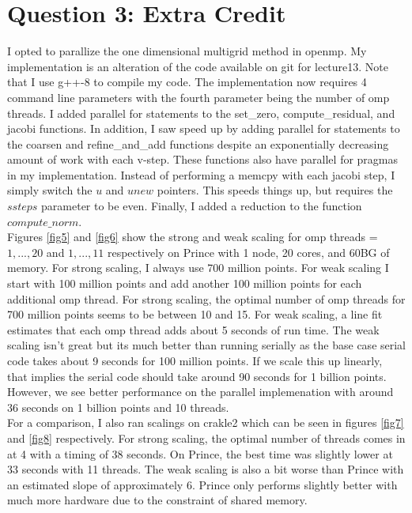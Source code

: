 \documentclass[10pt]{article}
\begin{document}
\lipsum


\section{Question 3: Extra Credit}

I opted to parallize the one dimensional multigrid method in openmp. My implementation is an alteration of the code available on git for lecture13. Note that I use g++-8 to compile my code. The implementation now requires 4 command line parameters with the fourth parameter being the number of omp threads. I added parallel for statements to the set\_zero, compute\_residual, and jacobi functions. In addition, I saw speed up by adding parallel for statements to the coarsen and refine\_and\_add functions despite an exponentially decreasing amount of work with each v-step. These functions also have parallel for pragmas in my implementation. Instead of performing a memcpy with each jacobi step, I simply switch the $u$ and $unew$ pointers. This speeds things up, but requires the $ssteps$ parameter to be even. Finally, I added a reduction to the function $compute\_norm$.\\

Figures \ref{fig5} and \ref{fig6} show the strong and weak scaling for omp threads = $1,...,20$ and $1,...,11$ respectively on Prince with 1 node, 20 cores, and 60BG of memory. For strong scaling, I always use 700 million points. For weak scaling I start with 100 million points and add another 100 million points for each additional omp thread. For strong scaling, the optimal number of omp threads for 700 million points seems to be between 10 and 15. For weak scaling, a line fit estimates that each omp thread adds about 5 seconds of run time. The weak scaling isn't great but its much better than running serially as the base case serial code takes about 9 seconds for 100 million points. If we scale this up linearly, that implies the serial code should take around 90 seconds for 1 billion points. However, we see better performance on the parallel implemenation with around 36 seconds on 1 billion points and 10 threads.\\

For a comparison, I also ran scalings on crakle2 which can be seen in figures \ref{fig7} and \ref{fig8} respectively. For strong scaling, the optimal number of threads comes in at 4 with a timing of 38 seconds. On Prince, the best time was slightly lower at 33 seconds with 11 threads. The weak scaling is also a bit worse than Prince with an estimated slope of approximately 6. Prince only performs slightly better with much more hardware due to the constraint of shared memory.
\end{document}

